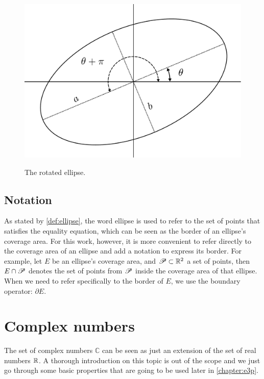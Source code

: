 \begin{figure}[H]
	\centering
	
	\caption{The rotated ellipse.}
	\includegraphics[scale=.38]{tex/figures/rotated_ellipse}
	\fautor
	\label{fig:rotated_ellipse}
\end{figure}


\subsection{Notation}

As stated by \autoref{def:ellipse}, the word ellipse is used to refer to the set of points that satisfies the equality equation, which can be seen as the border of an ellipse's coverage area. For this work, however, it is more convenient to refer directly to the coverage area of an ellipse and add a notation to express its border. For example, let $E$ be an ellipse's coverage area, and $\mathscr{P} \subset \mathbb{R}^2$ a set of points, then $E \cap \mathscr{P}$ denotes the set of points from $\mathscr{P}$ inside the coverage area of that ellipse. When we need to refer specifically to the border of $E$, we use the boundary operator: $\partial E$.


\section{Complex numbers}

The set of complex numbers $\mathbb{C}$ can be seen as just an extension of the set of real numbers $\mathbb{R}$. A thorough introduction on this topic is out of the scope and we just go through some basic properties that are going to be used later in \autoref{chapter:e3p}.

